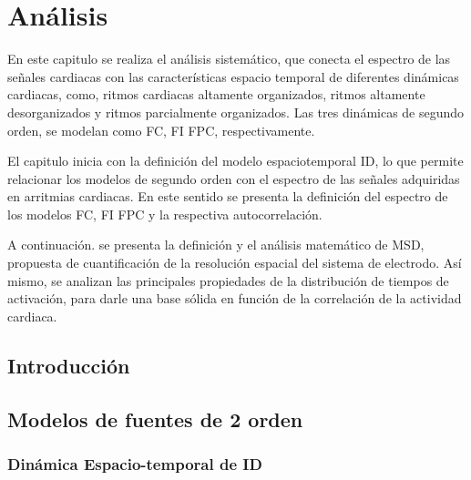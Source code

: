 
\chapter{Análisis}

\begin{resumen}

En este capitulo se realiza el análisis sistemático,  que conecta el espectro de las señales cardiacas con las características espacio temporal de diferentes dinámicas cardiacas, como, ritmos cardiacas altamente organizados, ritmos altamente desorganizados y ritmos parcialmente organizados. Las tres dinámicas de segundo orden,  se modelan  como \acf{FC}, \acf{FI} \acf{FPC}, respectivamente.

El capitulo inicia con la definición  del modelo espaciotemporal \acf{ID}, lo que permite relacionar los modelos de segundo orden con el espectro de las señales adquiridas en arritmias cardiacas. En este sentido se presenta la definición del  espectro de los modelos \ac{FC}, \ac{FI} \ac{FPC} y la respectiva autocorrelación.

A continuación. se presenta la definición y el análisis matemático  de \acf{MSD}, propuesta de  cuantificación de la resolución espacial del sistema de electrodo. Así mismo, se analizan las principales propiedades de la distribución de tiempos de activación, para darle una base sólida en función de la correlación de la  actividad cardiaca.
  


\end{resumen}

\section{Introducción}
\section{Modelos de fuentes de 2 orden}
\subsection{Dinámica Espacio-temporal de \acf{ID}}

